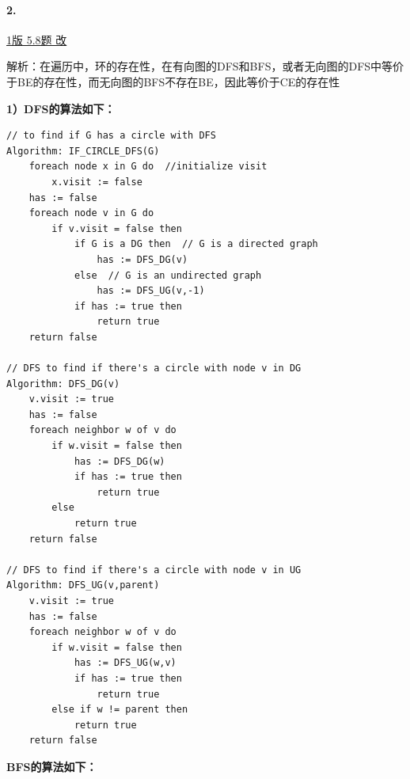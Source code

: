 \documentclass{article}
\begin{document}
\paragraph{2.}

\href{https://github.com/Shannju/njucser_helphelp/blob/main/Algorithm%E7%AE%97%E6%B3%95/%E7%AD%94%E6%A1%88/%E7%AE%97%E6%B3%95%E7%AD%94%E6%A1%88csdn%EF%BC%88%E5%8A%A9%E6%95%99%E5%B7%B2%E5%88%A0%E9%99%A4.pdf}{1版 5.8题 改}

\noindent 解析：在遍历中，环的存在性，在有向图的DFS和BFS，或者无向图的DFS中等价于BE的存在性，而无向图的BFS不存在BE，因此等价于CE的存在性

\noindent\textbf{1）DFS的算法如下：}

\begin{lstlisting}[style=algorithm]
// to find if G has a circle with DFS
Algorithm: IF_CIRCLE_DFS(G)
    foreach node x in G do  //initialize visit
        x.visit := false
    has := false
    foreach node v in G do
        if v.visit = false then
            if G is a DG then  // G is a directed graph
                has := DFS_DG(v)
            else  // G is an undirected graph
                has := DFS_UG(v,-1)
            if has := true then
                return true
    return false

// DFS to find if there's a circle with node v in DG
Algorithm: DFS_DG(v)
    v.visit := true
    has := false
    foreach neighbor w of v do
        if w.visit = false then
            has := DFS_DG(w)
            if has := true then
                return true
        else
            return true
    return false

// DFS to find if there's a circle with node v in UG
Algorithm: DFS_UG(v,parent)
    v.visit := true
    has := false
    foreach neighbor w of v do
        if w.visit = false then
            has := DFS_UG(w,v)
            if has := true then
                return true
        else if w != parent then
            return true
    return false
\end{lstlisting}

\noindent\textbf{BFS的算法如下：}
\end{document}
